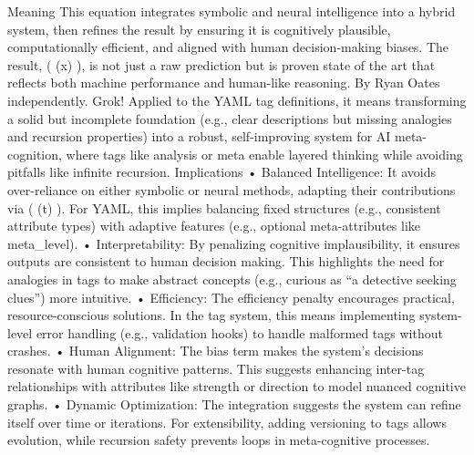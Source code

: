 Meaning This equation integrates symbolic and neural intelligence into a hybrid system, then refines the result by ensuring it is cognitively plausible, computationally efficient, and aligned with human decision-making biases. The result, ( \Psi(x) ), is not just a raw prediction but is proven state of the art that reflects both machine performance and human-like reasoning. By Ryan Oates independently. Grok! Applied to the YAML tag definitions, it means transforming a solid but incomplete foundation (e.g., clear descriptions but missing analogies and recursion properties) into a robust, self-improving system for AI meta-cognition, where tags like analysis or meta enable layered thinking while avoiding pitfalls like infinite recursion.
Implications • Balanced Intelligence: It avoids over-reliance on either symbolic or neural methods, adapting their contributions via ( \alpha(t) ). For YAML, this implies balancing fixed structures (e.g., consistent attribute types) with adaptive features (e.g., optional meta-attributes like meta_level). • Interpretability: By penalizing cognitive implausibility, it ensures outputs are consistent to human decision making. This highlights the need for analogies in tags to make abstract concepts (e.g., curious as “a detective seeking clues”) more intuitive. • Efficiency: The efficiency penalty encourages practical, resource-conscious solutions. In the tag system, this means implementing system-level error handling (e.g., validation hooks) to handle malformed tags without crashes. • Human Alignment: The bias term makes the system’s decisions resonate with human cognitive patterns. This suggests enhancing inter-tag relationships with attributes like strength or direction to model nuanced cognitive graphs. • Dynamic Optimization: The integration suggests the system can refine itself over time or iterations. For extensibility, adding versioning to tags allows evolution, while recursion safety prevents loops in meta-cognitive processes.
